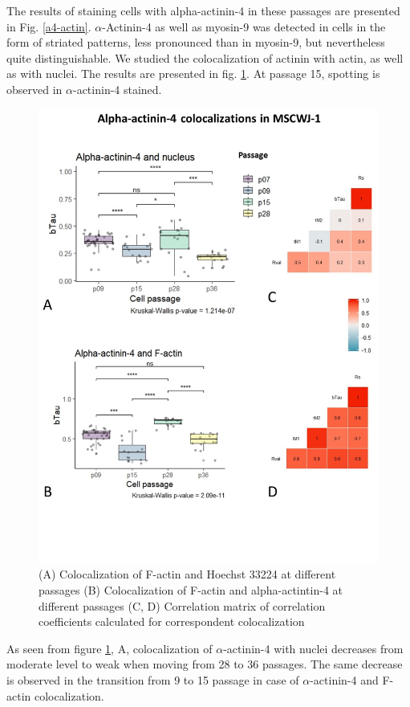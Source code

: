 \documentclass[english,authoryear]{elsarticle}
\begin{document}
The results of staining cells with alpha-actinin-4 in these passages are presented in Fig. \ref{a4-actin}.
$\alpha$-Actinin-4 as well as myosin-9 was detected in cells in the form of striated patterns, less pronounced than in myosin-9, but nevertheless quite distinguishable.
We studied the colocalization of actinin with actin, as well as with nuclei.
The results are presented in fig. \ref{a4-actin-col}.
At passage 15, spotting is observed in $\alpha$-actinin-4 stained.

\begin{figure}[hbt!]
\centering
\includegraphics[width=0.8\linewidth]{fig_a4-actin-col.jpg}
\caption{(A) Colocalization of F-actin and Hoechst 33224 at different passages (B) Colocalization of F-actin and alpha-actintin-4 at different passages (C, D) Correlation matrix of correlation coefficients calculated for correspondent colocalization}
\label{a4-actin-col}
\end{figure}

As seen from figure \ref{a4-actin-col}, A, colocalization of $\alpha$-actinin-4 with nuclei decreases from moderate level to weak when moving from 28 to 36 passages.
The same decrease is observed in the transition from 9 to 15 passage in case of $\alpha$-actinin-4 and F-actin colocalization.
\end{document}
